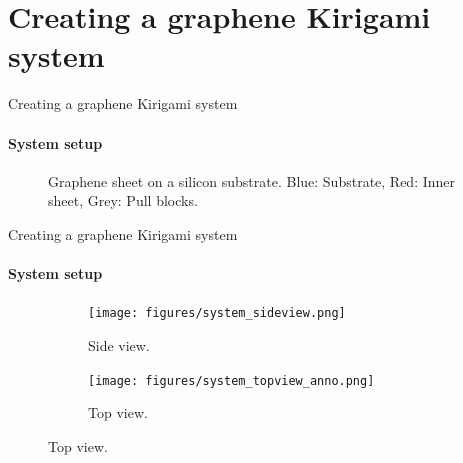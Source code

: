 \documentclass[
	10pt, %
]{beamer}
\begin{document}
\section{Creating a graphene Kirigami system} %
\begin{frame}{Creating a graphene Kirigami system}
\framesubtitle{System setup}
\begin{figure}
	\centering    
	\caption{Graphene sheet on a silicon substrate. Blue: Substrate, Red: Inner sheet, Grey: Pull blocks.}
\end{figure} 
	
\end{frame}




\begin{frame}{Creating a graphene Kirigami system}
\framesubtitle{System setup}

\begin{figure}[H]
	\centering
	\begin{subfigure}[b]{0.5\textwidth}
		\centering
		\texttt{[image: figures/system\_sideview.png]}
		\caption{Side view.}
	\end{subfigure}
	\begin{subfigure}[b]{0.5\textwidth}
		\centering
		\texttt{[image: figures/system\_topview\_anno.png]}
		\caption{Top view.}
	\end{subfigure}
  \end{figure}
  



\end{frame}
\end{document}
